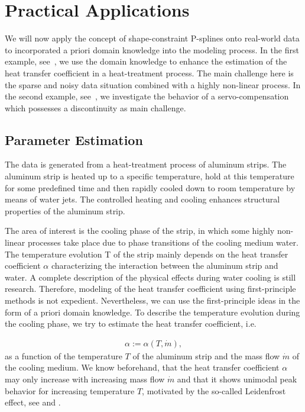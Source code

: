\chapter{Practical Applications} \label{cha:practical-appl}

We will now apply the concept of shape-constraint P-splines onto real-world data to incorporated a priori domain knowledge into the modeling process. In the first example, see~, we use the domain knowledge to enhance the estimation of the heat transfer coefficient in a heat-treatment process. The main challenge here is the sparse and noisy data situation combined with a highly non-linear process. In the second example, see~, we investigate the behavior of a servo-compensation which possesses a discontinuity as main challenge.  

\section{Parameter Estimation} \label{sec:real-world-application}

The data is generated from a heat-treatment process of aluminum strips. The aluminum strip is heated up to a specific temperature, hold at this temperature for some predefined time and then rapidly cooled down to room temperature by means of water jets. The controlled heating and cooling enhances structural properties of the aluminum strip.

The area of interest is the cooling phase of the strip, in which some highly non-linear processes take place due to phase transitions of the cooling medium water. The temperature evolution T of the strip mainly depends on the heat transfer coefficient $\alpha$ characterizing the interaction between the aluminum strip and water. A complete description of the physical effects during water cooling is still research. Therefore, modeling of the heat transfer coefficient using first-principle methods is not expedient. Nevertheless, we can use the first-principle ideas in the form of a priori domain knowledge. To describe the temperature evolution during the cooling phase, we try to estimate the heat transfer coefficient, i.e.

\begin{align}
	\alpha := \alpha(T, \dot m),
\end{align}
%
as a function of the temperature $T$ of the aluminum strip and the mass flow $\dot m$ of the cooling medium. We know beforehand, that the heat transfer coefficient $\alpha$ may only increase with increasing mass flow $\dot m$ and that it shows unimodal peak behavior for increasing temperature $T$, motivated by the so-called Leidenfrost effect, see \cite{mayinger2013stromung} and \cite{baehr2006heatandmasstransfer}.

